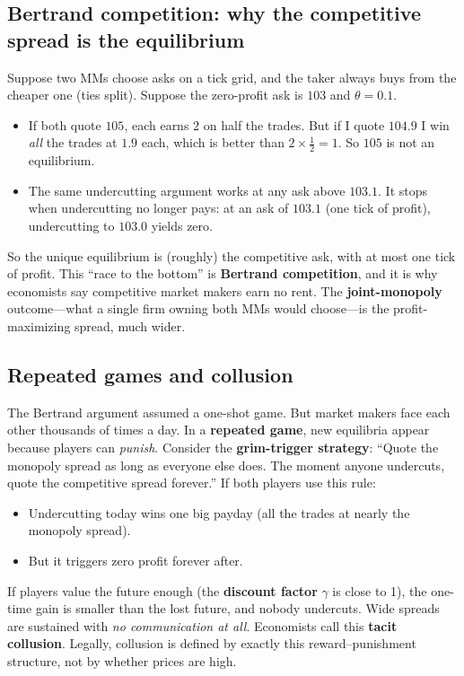 \documentclass[11pt]{article}
\begin{document}
\subsection{Bertrand competition: why the competitive spread is the equilibrium}
Suppose two MMs choose asks on a tick grid, and the taker always buys from the cheaper one (ties split). Suppose the zero-profit ask is $103$ and $\theta=0.1$.
\begin{itemize}
\item If both quote $105$, each earns $2$ on half the trades. But if I quote $104.9$ I win \emph{all} the trades at $1.9$ each, which is better than $2\times\frac12=1$. So $105$ is not an equilibrium.
\item The same undercutting argument works at any ask above $103.1$. It stops when undercutting no longer pays: at an ask of $103.1$ (one tick of profit), undercutting to $103.0$ yields zero.
\end{itemize}
So the unique equilibrium is (roughly) the competitive ask, with at most one tick of profit. This ``race to the bottom'' is \textbf{Bertrand competition}, and it is why economists say competitive market makers earn no rent. The \textbf{joint-monopoly} outcome---what a single firm owning both MMs would choose---is the profit-maximizing spread, much wider.

\subsection{Repeated games and collusion}
The Bertrand argument assumed a one-shot game. But market makers face each other thousands of times a day. In a \textbf{repeated game}, new equilibria appear because players can \emph{punish}. Consider the \textbf{grim-trigger strategy}: ``Quote the monopoly spread as long as everyone else does. The moment anyone undercuts, quote the competitive spread forever.'' If both players use this rule:
\begin{itemize}
\item Undercutting today wins one big payday (all the trades at nearly the monopoly spread).
\item But it triggers zero profit forever after.
\end{itemize}
If players value the future enough (the \textbf{discount factor} $\gamma$ is close to 1), the one-time gain is smaller than the lost future, and nobody undercuts. Wide spreads are sustained with \emph{no communication at all}. Economists call this \textbf{tacit collusion}. Legally, collusion is defined by exactly this reward--punishment structure, not by whether prices are high.
\end{document}
